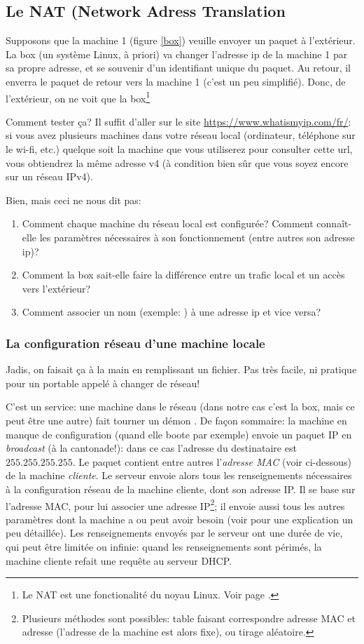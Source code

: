 \subsection{Le NAT (Network Adress Translation}\label{nat}
Supposons que la machine 1 (figure \ref{box}) veuille envoyer un
paquet à l'extérieur. La box (un système Linux, à priori) va changer
l'adresse ip  de la machine 1 par sa propre adresse, et se
souvenir d'un identifiant unique du paquet. Au retour, il enverra le
paquet de retour vers la machine 1 (c'est un peu simplifié). Donc, de
l'extérieur, on ne voit que la \og box\fg\footnote{Le NAT est une
  fonctionalité du noyau Linux. Voir page \pageref{firewall}.}

Comment tester ça? Il suffit d'aller sur le site
\url{https://www.whatismyip.com/fr/}: si vous avez plusieurs machines
dans votre réseau local (ordinateur, téléphone sur le wi-fi, etc.)
quelque soit la machine que vous utiliserez pour consulter cette url,
vous obtiendrez la même adresse v4 (à condition bien sûr que vous
soyez encore sur un réseau IPv4).

Bien, mais ceci ne nous dit pas:
\begin{enumerate}
\item Comment chaque machine du réseau local est configurée?
  Comment  connaît-elle les
    paramètres nécessaires à son fonctionnement (entre autres son adresse ip)?
  \item Comment la box sait-elle faire la différence entre un trafic
    local et un accès vers l'extérieur?
  \item Comment associer un nom (exemple: ) à une
    adresse ip et vice versa?
\end{enumerate}


\subsubsection{La configuration réseau d'une machine locale}
Jadis, on faisait ça à la main en remplissant un fichier. Pas très
facile, ni pratique pour un portable appelé à changer de réseau!

C'est un service: une machine dans le réseau (dans notre cas c'est la
box, mais ce peut être une autre) fait tourner un démon .
De façon sommaire: la machine en manque de configuration (quand elle
boote par exemple) envoie un
paquet IP en \emph{broadcast} (à la cantonade!): dans ce cas l'adresse
du destinataire  est $255.255.255.255$. Le 
paquet contient 
entre autres l'\emph{adresse MAC} (voir ci-dessous) de la machine
\emph{cliente}. Le 
serveur  envoie alors tous les renseignements nécessaires à
la configuration réseau de la machine cliente, dont son adresse IP. Il 
se base sur l'adresse MAC, pour lui associer une adresse
IP\footnote{Plusieurs méthodes sont possibles: table faisant
  correspondre adresse MAC et adresse (l'adresse de la machine est
  alors fixe), ou tirage 
  aléatoire.}; il envoie aussi tous les autres paramètres dont la
machine a ou peut avoir besoin
(voir \cite{dhcp} pour une explication un peu détaillée). Les
renseignements envoyés par le serveur ont une durée de 
vie, qui peut être limitée ou infinie: quand les renseignements sont
périmés, la 
machine cliente refait une requête au serveur DHCP.
